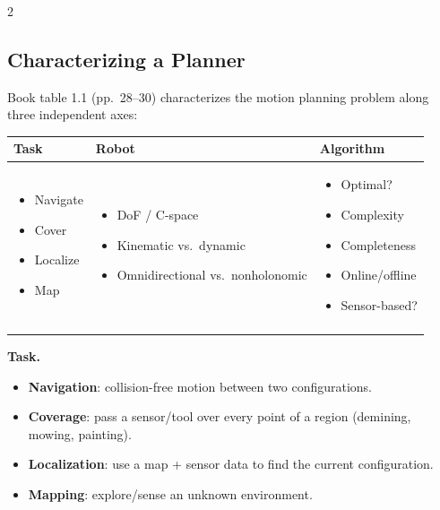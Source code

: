 \documentclass[10pt,a4paper]{article}
\newcommand{\keyterm}[1]{\textbf{#1}}
\begin{document}
\begin{multicols}{2}
\subsection{Characterizing a Planner}

Book table 1.1 (pp.\ 28--30) characterizes the motion planning problem along three independent axes:

\begin{center}\small
\renewcommand{\arraystretch}{1.15}
\setlength{\tabcolsep}{4pt}
\begin{tabular}{@{}p{2.1cm}p{3.0cm}p{2.6cm}@{}}
\toprule
\textbf{Task} & \textbf{Robot} & \textbf{Algorithm} \\
\midrule
\begin{itemize}[leftmargin=1em,itemsep=2pt,topsep=2pt]
\item Navigate
\item Cover
\item Localize
\item Map
\end{itemize}
&
\begin{itemize}[leftmargin=1em,itemsep=2pt,topsep=2pt]
\item DoF / C-space
\item Kinematic vs.\ dynamic
\item Omnidirectional vs.\ nonholonomic
\end{itemize}
&
\begin{itemize}[leftmargin=1em,itemsep=2pt,topsep=2pt]
\item Optimal?
\item Complexity
\item Completeness
\item Online/offline
\item Sensor-based?
\end{itemize} \\ \\
\bottomrule
\end{tabular}
\end{center}

\textbf{Task.}
\begin{itemize}
\item \keyterm{Navigation}: collision-free motion between two configurations.
\item \keyterm{Coverage}: pass a sensor/tool over every point of a region (demining, mowing, painting).
\item \keyterm{Localization}: use a map + sensor data to find the current configuration.
\item \keyterm{Mapping}: explore/sense an unknown environment.
\end{itemize}


\end{multicols}
\end{document}
